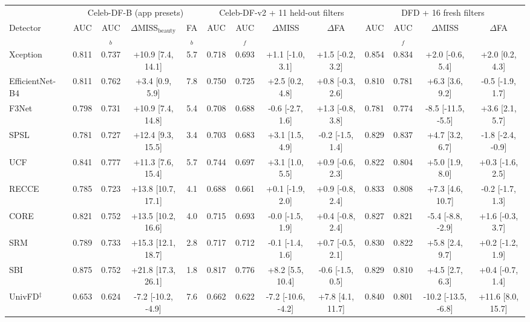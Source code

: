 \begin{tabular}{@{}l cccc cccc cccc@{}}
\toprule
 & \multicolumn{4}{c}{Celeb-DF-B (app presets)} & \multicolumn{4}{c}{Celeb-DF-v2 + 11 held-out filters} & \multicolumn{4}{c}{DFD + 16 fresh filters} \\
\cmidrule(lr){2-5}\cmidrule(lr){6-9}\cmidrule(lr){10-13}
Detector & AUC & AUC$_b$ & $\Delta$MISS$_\text{beauty}$ & FA$_b$ & AUC & AUC$_f$ & $\Delta$MISS & $\Delta$FA & AUC & AUC$_f$ & $\Delta$MISS & $\Delta$FA \\
\midrule
Xception~\cite{xception} & 0.811 & 0.737 & +10.9 [7.4, 14.1] & 5.7 & 0.718 & 0.693 & +1.1 [-1.0, 3.1] & +1.5 [-0.2, 3.2] & 0.854 & 0.834 & +2.0 [-0.6, 5.4] & +2.0 [0.2, 4.3] \\
EfficientNet-B4~\cite{efficientnet} & 0.811 & 0.762 & +3.4 [0.9, 5.9] & 7.8 & 0.750 & 0.725 & +2.5 [0.2, 4.8] & +0.8 [-0.3, 2.6] & 0.810 & 0.781 & +6.3 [3.6, 9.2] & -0.5 [-1.9, 1.7] \\
F3Net~\cite{f3net} & 0.798 & 0.731 & +10.9 [7.4, 14.8] & 5.4 & 0.708 & 0.688 & -0.6 [-2.7, 1.6] & +1.3 [-0.8, 3.8] & 0.781 & 0.774 & -8.5 [-11.5, -5.5] & +3.6 [2.1, 5.7] \\
SPSL~\cite{spsl} & 0.781 & 0.727 & +12.4 [9.3, 15.5] & 3.4 & 0.703 & 0.683 & +3.1 [1.5, 4.9] & -0.2 [-1.5, 1.4] & 0.829 & 0.837 & +4.7 [3.2, 6.7] & -1.8 [-2.4, -0.9] \\
UCF~\cite{ucf} & 0.841 & 0.777 & +11.3 [7.6, 15.4] & 5.7 & 0.744 & 0.697 & +3.1 [1.0, 5.5] & +0.9 [-0.6, 2.3] & 0.822 & 0.804 & +5.0 [1.9, 8.0] & +0.3 [-1.6, 2.5] \\
RECCE~\cite{recce} & 0.785 & 0.723 & +13.8 [10.7, 17.1] & 4.1 & 0.688 & 0.661 & +0.1 [-1.9, 2.0] & +0.9 [-0.8, 2.4] & 0.833 & 0.808 & +7.3 [4.6, 10.7] & -0.2 [-1.7, 1.3] \\
CORE~\cite{core} & 0.821 & 0.752 & +13.5 [10.2, 16.6] & 4.0 & 0.715 & 0.693 & -0.0 [-1.5, 1.9] & +0.4 [-0.8, 2.4] & 0.827 & 0.821 & -5.4 [-8.8, -2.9] & +1.6 [-0.3, 3.7] \\
SRM~\cite{srm} & 0.789 & 0.733 & +15.3 [12.1, 18.7] & 2.8 & 0.717 & 0.712 & -0.1 [-1.4, 1.6] & +0.7 [-0.5, 2.1] & 0.830 & 0.822 & +5.8 [2.4, 9.7] & +0.2 [-1.2, 1.9] \\
SBI~\cite{sbi} & 0.875 & 0.752 & +21.8 [17.3, 26.1] & 1.8 & 0.817 & 0.776 & +8.2 [5.5, 10.4] & -0.6 [-1.5, 0.5] & 0.829 & 0.810 & +4.5 [2.7, 6.3] & +0.4 [-0.7, 1.4] \\
UnivFD$^\ddagger$~\cite{univfd} & 0.653 & 0.624 & -7.2 [-10.2, -4.9] & 7.6 & 0.662 & 0.622 & -7.2 [-10.6, -4.2] & +7.8 [4.1, 11.7] & 0.840 & 0.801 & -10.2 [-13.5, -6.8] & +11.6 [8.0, 15.7] \\

\end{tabular}
